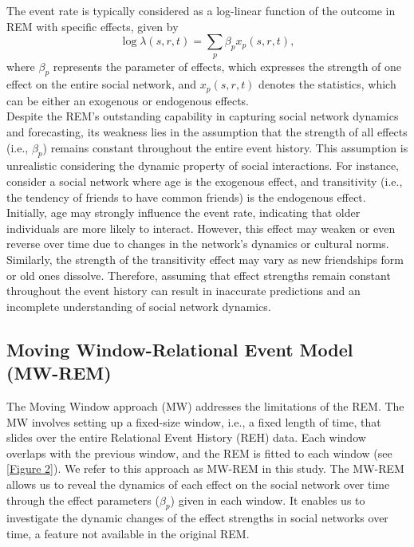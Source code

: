 \documentclass[]{interact}
\theoremstyle{plain}%
\theoremstyle{definition}
\theoremstyle{remark}
\begin{document}
{	The event rate is typically considered as a log-linear function of the outcome in REM with specific effects, given by
	\begin{equation} \label{3}
		\log \lambda(s,r,t) = \sum_{p} \beta_p x_p(s,r,t),
	\end{equation}
	where $\beta_p$ represents the parameter of effects, which expresses the strength of one effect on the entire social network, and $x_p(s,r,t)$ denotes the statistics, which can be either an exogenous or endogenous effects. \\
	
	Despite the REM's outstanding capability in capturing social network dynamics and forecasting, its weakness lies in the assumption that the strength of all effects (i.e., $\beta_p$) remains constant throughout the entire event history. This assumption is unrealistic considering the dynamic property of social interactions. For instance, consider a social network where age is the exogenous effect, and transitivity (i.e., the tendency of friends to have common friends) is the endogenous effect. Initially, age may strongly influence the event rate, indicating that older individuals are more likely to interact. However, this effect may weaken or even reverse over time due to changes in the network's dynamics or cultural norms. Similarly, the strength of the transitivity effect may vary as new friendships form or old ones dissolve. Therefore, assuming that effect strengths remain constant throughout the event history can result in inaccurate predictions and an incomplete understanding of social network dynamics.
	
	\subsection{Moving Window-Relational Event Model (MW-REM)}
	
	\hspace{0.23cm} The Moving Window approach (MW) \cite{mulderModelingEvolutionInteraction2019} addresses the limitations of the REM. The MW involves setting up a fixed-size window, i.e., a fixed length of time, that slides over the entire Relational Event History (REH) data. Each window overlaps with the previous window, and the REM is fitted to each window (see \autoref{Figure 2}). We refer to this approach as MW-REM in this study. The MW-REM allows us to reveal the dynamics of each effect on the social network over time through the effect parameters ($\beta_p$) given in each window. It enables us to investigate the dynamic changes of the effect strengths in social networks over time, a feature not available in the original REM. \\

}
\end{document}
